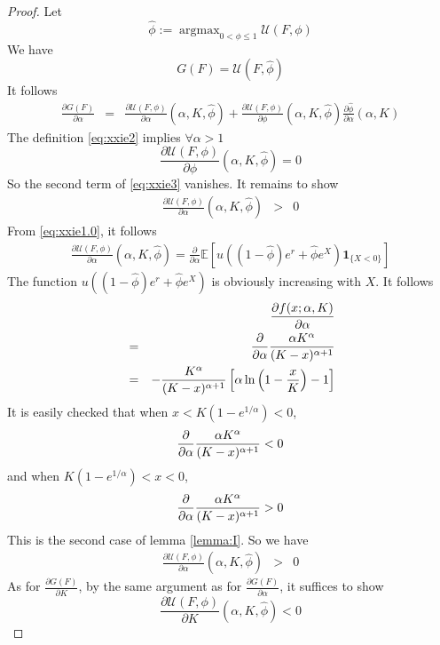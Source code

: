 \documentclass{article}
\newcommand{\pd}[2]{
  \frac{\partial #1}{\partial #2}
}
\newcommand{\opd}[1]{
  \frac{\partial}{\partial #1}
}
\newcommand{\E}{
  \mathbb{E}
}
\newcommand{\1}[1]{
  \mathbf{1}_{\{#1\}}
}
\DeclareMathOperator*{\argmax}{argmax}
\begin{document}
\begin{proof}
  Let
  \begin{equation}
    \label{eq:xxie2}
    \hat \phi := \argmax_{0 < \phi \leq 1} \mathcal U(F, \phi)
  \end{equation}
  We have
  \[
  G(F) = \mathcal U(F, \hat\phi)
  \]
  It follows
  \begin{eqnarray}
    \pd{G(F)}{\alpha}
    &=&
    \pd{\mathcal U(F, \phi)}{\alpha}(\alpha, K, \hat\phi)
    + \pd{\mathcal U(F, \phi)}{\phi}(\alpha, K, \hat\phi)
    \pd{\hat\phi}{\alpha}(\alpha, K)
    \label{eq:xxie3}
  \end{eqnarray}
  The definition \eqref{eq:xxie2} implies $\forall \alpha > 1$
  \begin{equation}
    \label{eq:xxie4}
    \pd{\mathcal U(F, \phi)}{\phi}(\alpha, K, \hat \phi) = 0
  \end{equation}
  So the second term of \eqref{eq:xxie3} vanishes. It remains to show
  \begin{eqnarray*}
    \pd{\mathcal U(F, \phi)}{\alpha}(\alpha, K, \hat \phi)
    &>& 0
  \end{eqnarray*}
  From \eqref{eq:xxie1.0}, it follows
  \begin{eqnarray*}
    \pd{\mathcal U(F, \phi)}{\alpha}(\alpha, K, \hat\phi)
    = \opd{\alpha}\E[u((1 - \hat\phi) e^r + \hat\phi e^X) \1{X < 0}]
  \end{eqnarray*}
  The function $u((1 - \hat\phi) e^r + \hat\phi e^X)$ is obviously increasing
  with $X$. It follows
  \begin{eqnarray*}
    && \pd{f(x; \alpha, K)}{\alpha} \\
    &=& \opd{\alpha} {\alpha K^\alpha \over (K - x)^{\alpha + 1}} \\
    &=&
    - {K^\alpha \over (K - x)^{\alpha + 1}}
    \left[
      \alpha
      \ln\left(
        1 - {x \over K}
      \right) - 1
    \right]
  \end{eqnarray*}
  It is easily checked that when $x < K(1 - e^{1/\alpha}) < 0$,
  \[
  \opd{\alpha} {\alpha K^\alpha \over (K - x)^{\alpha + 1}} < 0
  \]
  and when $K(1 - e^{1/\alpha}) < x < 0$,
  \[
  \opd{\alpha} {\alpha K^\alpha \over (K - x)^{\alpha + 1}} > 0
  \]
  This is the second case of lemma \ref{lemma:I}. So we have
  \begin{eqnarray*}
    \pd{\mathcal U(F, \phi)}{\alpha}(\alpha, K, \hat\phi) &>& 0
  \end{eqnarray*}
  As for $\pd{G(F)}{K}$, by the same argument as for
  $\pd{G(F)}{\alpha}$, it suffices to show
  \[
  \pd{\mathcal U(F, \phi)}{K}(\alpha, K, \hat\phi) < 0
\]
\end{proof}
\end{document}
